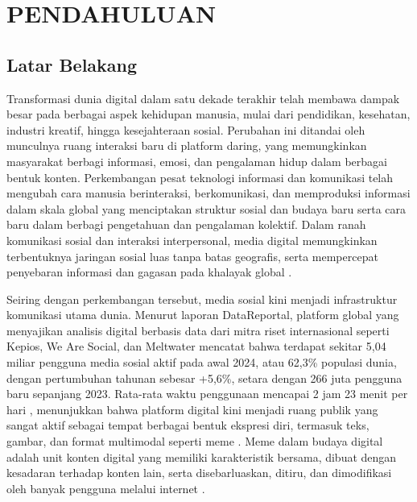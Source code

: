 ﻿\newpage
\pagestyle{alternatingstyle}
\chapter{PENDAHULUAN} \label{Bab I}

\section{Latar Belakang} \label{I.Latar Belakang}
Transformasi dunia digital dalam satu dekade terakhir telah membawa dampak besar pada berbagai aspek kehidupan manusia, mulai dari pendidikan, kesehatan, industri kreatif, hingga kesejahteraan sosial. Perubahan ini ditandai oleh munculnya ruang interaksi baru di platform daring, yang memungkinkan masyarakat berbagi informasi, emosi, dan pengalaman hidup dalam berbagai bentuk konten. Perkembangan pesat teknologi informasi dan komunikasi telah mengubah cara manusia berinteraksi, berkomunikasi, dan memproduksi informasi dalam skala global yang menciptakan struktur sosial dan budaya baru serta cara baru dalam berbagi pengetahuan dan pengalaman kolektif. Dalam ranah komunikasi sosial dan interaksi interpersonal, media digital memungkinkan terbentuknya jaringan sosial luas tanpa batas geografis, serta mempercepat penyebaran informasi dan gagasan pada khalayak global \cite{SyakhraniWidijatmoko2024}. 

Seiring dengan perkembangan tersebut, media sosial kini menjadi infrastruktur komunikasi utama dunia. Menurut laporan DataReportal, platform global yang menyajikan analisis digital berbasis data dari mitra riset internasional seperti Kepios, We Are Social, dan Meltwater mencatat bahwa terdapat sekitar 5,04 miliar pengguna media sosial aktif pada awal 2024, atau 62,3\% populasi dunia, dengan pertumbuhan tahunan sebesar +5,6\%, setara dengan 266 juta pengguna baru sepanjang 2023. Rata-rata waktu penggunaan mencapai 2 jam 23 menit per hari , menunjukkan bahwa platform digital kini menjadi ruang publik yang sangat aktif sebagai tempat berbagai bentuk ekspresi diri, termasuk teks, gambar, dan format multimodal seperti meme \cite{datareportal2024_global}\cite {datareportal2024_5billion}. Meme dalam budaya digital adalah unit konten digital yang memiliki karakteristik bersama, dibuat dengan kesadaran terhadap konten lain, serta disebarluaskan, ditiru, dan dimodifikasi oleh banyak pengguna melalui internet \cite{shifman2013memes}. 

